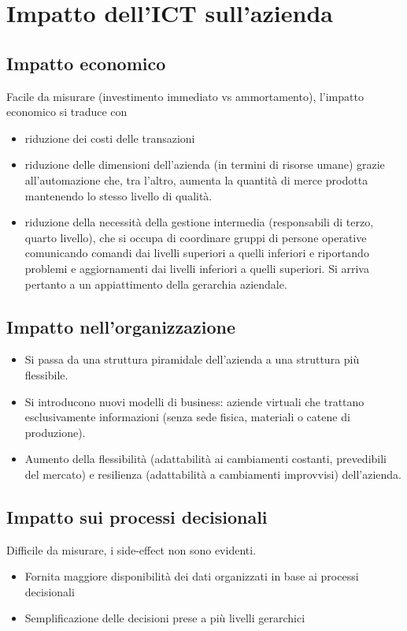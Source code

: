 \section{Impatto dell'ICT sull'azienda}
\subsection{Impatto economico}
Facile da misurare (investimento immediato vs ammortamento), l'impatto economico si traduce con
\begin{itemize}
\item riduzione dei costi delle transazioni
\item riduzione delle dimensioni dell'azienda (in termini di risorse umane) grazie all'automazione che, tra l'altro, aumenta la quantit\`a di merce prodotta mantenendo lo stesso livello di qualit\`a.
\item riduzione della necessit\`a della gestione intermedia (responsabili di terzo, quarto livello), che si occupa di coordinare gruppi di persone operative comunicando comandi dai livelli superiori a quelli inferiori e riportando problemi e aggiornamenti dai livelli inferiori a quelli superiori. Si arriva pertanto a un appiattimento della gerarchia aziendale.
\end{itemize}

\subsection{Impatto nell'organizzazione}
\begin{itemize}
\item Si passa da una struttura piramidale dell'azienda a una struttura pi\`u flessibile.
\item Si introducono nuovi modelli di business: aziende virtuali che trattano esclusivamente informazioni (senza sede fisica, materiali o catene di produzione).
\item Aumento della flessibilit\`a (adattabilit\`a ai cambiamenti costanti, prevedibili del mercato) e resilienza (adattabilit\`a a cambiamenti improvvisi) dell'azienda.
\end{itemize}

\subsection{Impatto sui processi decisionali}
Difficile da misurare, i side-effect non sono evidenti.
\begin{itemize}
\item Fornita maggiore disponibilit\`a dei dati organizzati in base ai processi decisionali
\item Semplificazione delle decisioni prese a pi\`u livelli gerarchici
\end{itemize}

